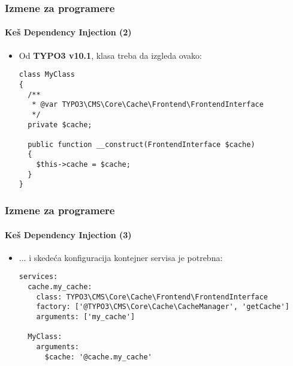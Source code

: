 
\begin{frame}[fragile]
	\frametitle{Izmene za programere}
	\framesubtitle{Keš Dependency Injection (2)}

	\lstset{basicstyle=\tiny\ttfamily}

	\begin{itemize}
		\item Od \textbf{TYPO3 v10.1}, klasa treba da izgleda ovako:

\begin{lstlisting}
class MyClass
{
  /**
   * @var TYPO3\CMS\Core\Cache\Frontend\FrontendInterface
   */
  private $cache;

  public function __construct(FrontendInterface $cache)
  {
    $this->cache = $cache;
  }
}
\end{lstlisting}

	\end{itemize}

\end{frame}


\begin{frame}[fragile]
	\frametitle{Izmene za programere}
	\framesubtitle{Keš Dependency Injection (3)}

	\lstset{basicstyle=\tiny\ttfamily}

	\begin{itemize}
		\item ... i skedeća konfiguracija kontejner servisa je potrebna:

\begin{lstlisting}
services:
  cache.my_cache:
    class: TYPO3\CMS\Core\Cache\Frontend\FrontendInterface
    factory: ['@TYPO3\CMS\Core\Cache\CacheManager', 'getCache']
    arguments: ['my_cache']

  MyClass:
    arguments:
      $cache: '@cache.my_cache'
\end{lstlisting}

	\end{itemize}

\end{frame}

